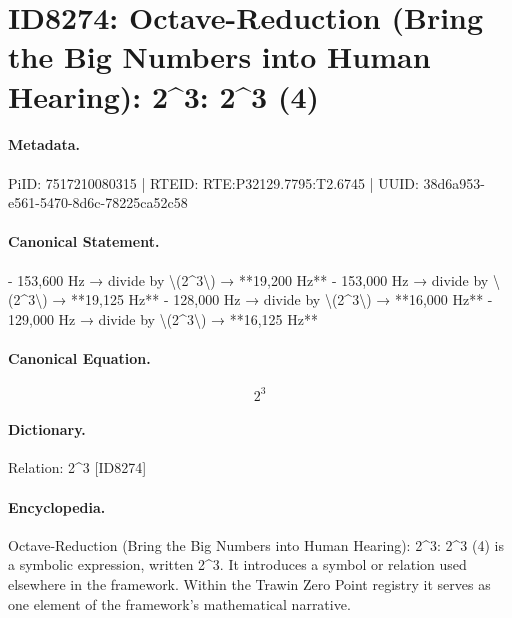 \section*{ID8274: Octave-Reduction (Bring the Big Numbers into Human Hearing): 2\textasciicircum{}3: 2\textasciicircum{}3 (4)}
\paragraph{Metadata.}
PiID: 7517210080315 | RTEID: RTE:P32129.7795:T2.6745 | UUID: 38d6a953-e561-5470-8d6c-78225ca52c58

\paragraph{Canonical Statement.}
- 153,600 Hz → divide by \textbackslash{}(2\textasciicircum{}3\textbackslash{}) → **19,200 Hz** - 153,000 Hz → divide by \textbackslash{}(2\textasciicircum{}3\textbackslash{}) → **19,125 Hz** - 128,000 Hz → divide by \textbackslash{}(2\textasciicircum{}3\textbackslash{}) → **16,000 Hz** - 129,000 Hz → divide by \textbackslash{}(2\textasciicircum{}3\textbackslash{}) → **16,125 Hz**

\paragraph{Canonical Equation.}
\[
2^3
\]

\paragraph{Dictionary.}
Relation: 2\textasciicircum{}3 [ID8274]

\paragraph{Encyclopedia.}
Octave-Reduction (Bring the Big Numbers into Human Hearing): 2\textasciicircum{}3: 2\textasciicircum{}3 (4) is a symbolic expression, written 2\textasciicircum{}3. It introduces a symbol or relation used elsewhere in the framework. Within the Trawin Zero Point registry it serves as one element of the framework's mathematical narrative.
